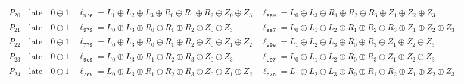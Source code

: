 \begin{longtable}{@{}rcc>{\raggedright\arraybackslash}p{}>{\raggedright\arraybackslash}p{}@{}}
$P_{20}$ & late & $0\mathbin{\oplus}1$ & $\ell_{\mathtt{97e}}=L_1\mathbin{\oplus}\allowbreak L_2\mathbin{\oplus}\allowbreak L_3\mathbin{\oplus}\allowbreak R_0\mathbin{\oplus}\allowbreak R_1\mathbin{\oplus}\allowbreak R_2\mathbin{\oplus}\allowbreak Z_0\mathbin{\oplus}\allowbreak Z_3$ & $\ell_{\mathtt{ee9}}=L_0\mathbin{\oplus}\allowbreak L_3\mathbin{\oplus}\allowbreak R_1\mathbin{\oplus}\allowbreak R_2\mathbin{\oplus}\allowbreak R_3\mathbin{\oplus}\allowbreak Z_1\mathbin{\oplus}\allowbreak Z_2\mathbin{\oplus}\allowbreak Z_3$ \\
$P_{21}$ & late & $0\mathbin{\oplus}1$ & $\ell_{\mathtt{979}}=L_0\mathbin{\oplus}\allowbreak L_3\mathbin{\oplus}\allowbreak R_0\mathbin{\oplus}\allowbreak R_1\mathbin{\oplus}\allowbreak R_2\mathbin{\oplus}\allowbreak Z_0\mathbin{\oplus}\allowbreak Z_3$ & $\ell_{\mathtt{ee7}}=L_0\mathbin{\oplus}\allowbreak L_1\mathbin{\oplus}\allowbreak L_2\mathbin{\oplus}\allowbreak R_1\mathbin{\oplus}\allowbreak R_2\mathbin{\oplus}\allowbreak R_3\mathbin{\oplus}\allowbreak Z_1\mathbin{\oplus}\allowbreak Z_2\mathbin{\oplus}\allowbreak Z_3$ \\
$P_{22}$ & late & $0\mathbin{\oplus}1$ & $\ell_{\mathtt{779}}=L_0\mathbin{\oplus}\allowbreak L_3\mathbin{\oplus}\allowbreak R_0\mathbin{\oplus}\allowbreak R_1\mathbin{\oplus}\allowbreak R_2\mathbin{\oplus}\allowbreak Z_0\mathbin{\oplus}\allowbreak Z_1\mathbin{\oplus}\allowbreak Z_2$ & $\ell_{\mathtt{e9e}}=L_1\mathbin{\oplus}\allowbreak L_2\mathbin{\oplus}\allowbreak L_3\mathbin{\oplus}\allowbreak R_0\mathbin{\oplus}\allowbreak R_3\mathbin{\oplus}\allowbreak Z_1\mathbin{\oplus}\allowbreak Z_2\mathbin{\oplus}\allowbreak Z_3$ \\
$P_{23}$ & late & $0\mathbin{\oplus}1$ & $\ell_{\mathtt{9e9}}=L_0\mathbin{\oplus}\allowbreak L_3\mathbin{\oplus}\allowbreak R_1\mathbin{\oplus}\allowbreak R_2\mathbin{\oplus}\allowbreak R_3\mathbin{\oplus}\allowbreak Z_0\mathbin{\oplus}\allowbreak Z_3$ & $\ell_{\mathtt{e97}}=L_0\mathbin{\oplus}\allowbreak L_1\mathbin{\oplus}\allowbreak L_2\mathbin{\oplus}\allowbreak R_0\mathbin{\oplus}\allowbreak R_3\mathbin{\oplus}\allowbreak Z_1\mathbin{\oplus}\allowbreak Z_2\mathbin{\oplus}\allowbreak Z_3$ \\
$P_{24}$ & late & $0\mathbin{\oplus}1$ & $\ell_{\mathtt{7e9}}=L_0\mathbin{\oplus}\allowbreak L_3\mathbin{\oplus}\allowbreak R_1\mathbin{\oplus}\allowbreak R_2\mathbin{\oplus}\allowbreak R_3\mathbin{\oplus}\allowbreak Z_0\mathbin{\oplus}\allowbreak Z_1\mathbin{\oplus}\allowbreak Z_2$ & $\ell_{\mathtt{e7e}}=L_1\mathbin{\oplus}\allowbreak L_2\mathbin{\oplus}\allowbreak L_3\mathbin{\oplus}\allowbreak R_0\mathbin{\oplus}\allowbreak R_1\mathbin{\oplus}\allowbreak R_2\mathbin{\oplus}\allowbreak Z_1\mathbin{\oplus}\allowbreak Z_2\mathbin{\oplus}\allowbreak Z_3$ \\
\end{longtable}
\endgroup
